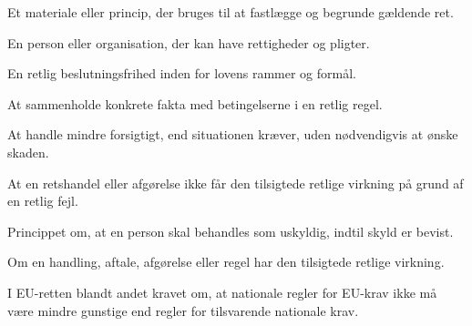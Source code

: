 \begin{description}[style=nextline,leftmargin=0pt,labelindent=0pt]
  \item[Retskilde] Et materiale eller princip, der bruges til at fastlægge og begrunde gældende ret.
  \item[Retssubjekt] En person eller organisation, der kan have rettigheder og pligter.
  \item[Skøn] En retlig beslutningsfrihed inden for lovens rammer og formål.
  \item[Subsumption] At sammenholde konkrete fakta med betingelserne i en retlig regel.
  \item[Uagtsomhed] At handle mindre forsigtigt, end situationen kræver, uden nødvendigvis at ønske skaden.
  \item[Ugyldighed] At en retshandel eller afgørelse ikke får den tilsigtede retlige virkning på grund af en retlig fejl.
  \item[Uskyldsformodning] Princippet om, at en person skal behandles som uskyldig, indtil skyld er bevist.
  \item[Gyldighed] Om en handling, aftale, afgørelse eller regel har den tilsigtede retlige virkning.
  \item[Ækvivalens] I EU-retten blandt andet kravet om, at nationale regler for EU-krav ikke må være mindre gunstige end regler for tilsvarende nationale krav.
\end{description}

